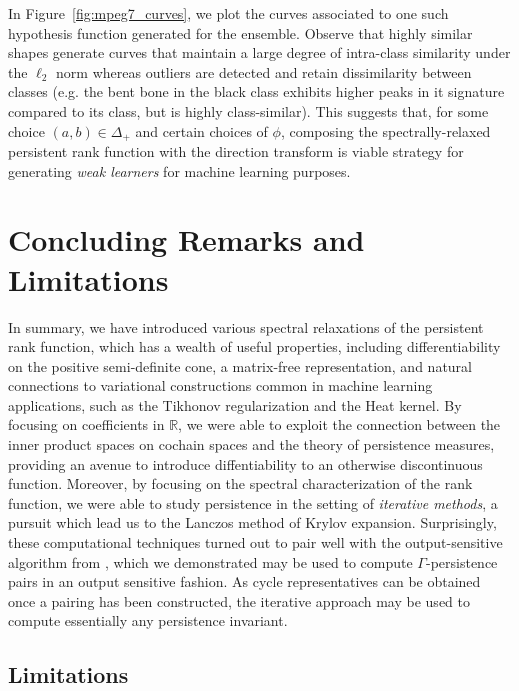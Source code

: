 \documentclass[pdflatex,sn-mathphys-num]{sn-jnl}
\begin{document}
In Figure~\ref{fig:mpeg7_curves}, we plot the curves associated to one such hypothesis function generated for the ensemble. Observe that highly similar shapes generate curves that maintain a large degree of intra-class similarity under the \(\ell_{2}\) norm whereas outliers are detected and retain dissimilarity between classes (e.g. the bent bone in the black class exhibits higher peaks in it signature compared to its class, but is highly class-similar). This suggests that, for some choice \((a,b) \in \Delta_{+}\) and certain choices of \(\phi\), composing the spectrally-relaxed persistent rank function with the direction transform is viable strategy for generating \emph{weak learners} for machine learning purposes.

\section{Concluding Remarks and Limitations}\label{sec:concluding-remarks}

In summary, we have introduced various spectral relaxations of the persistent rank function, which has a wealth of useful properties, including differentiability on the positive semi-definite cone, a matrix-free representation, and natural connections to variational constructions common in machine learning applications, such as the Tikhonov regularization and the Heat kernel. By focusing on coefficients in \(\mathbb{R}\), we were able to exploit the connection between the inner product spaces on cochain spaces and the theory of persistence measures, providing an avenue to introduce diffentiability to an otherwise discontinuous function. Moreover, by focusing on the spectral characterization of the rank function, we were able to study persistence in the setting of \emph{iterative methods}, a pursuit which lead us to the Lanczos method of Krylov expansion. Surprisingly, these computational techniques turned out to pair well with the output-sensitive algorithm from \cite{chen2011output}, which we demonstrated may be used to compute \(\Gamma\)-persistence pairs in an output sensitive fashion. As cycle representatives can be obtained once a pairing has been constructed, the iterative approach may be used to compute essentially any persistence invariant.

\subsection{Limitations}\label{sec:limitations}
\end{document}
